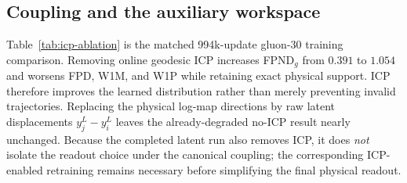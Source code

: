 \documentclass[10pt]{article}
\begin{document}
\begin{table}[H]
\centering
\caption{Controlled gluon-30 construction ablations. ``Evol.'' denotes evolving
auxiliary Lorentz vectors and ``fixed'' denotes message geometry frozen to $x$.
The 500k rows test training duration rather than a new architecture.}
\label{tab:gj-ablation}
\end{table}

\subsection{Coupling and the auxiliary workspace}

Table~\ref{tab:icp-ablation} is the matched 994k-update gluon-30 training comparison.
Removing online geodesic ICP increases FPND$_g$ from $0.391$ to $1.054$ and worsens
FPD, W1M, and W1P while retaining exact physical support. ICP therefore improves the
learned distribution rather than merely preventing invalid trajectories. Replacing the
physical log-map directions by raw latent displacements $y_j^L-y_i^L$ leaves the
already-degraded no-ICP result nearly unchanged. Because the completed latent run also
removes ICP, it does \emph{not} isolate the readout choice under the canonical coupling;
the corresponding ICP-enabled retraining remains necessary before simplifying the final
physical readout.
\end{document}
